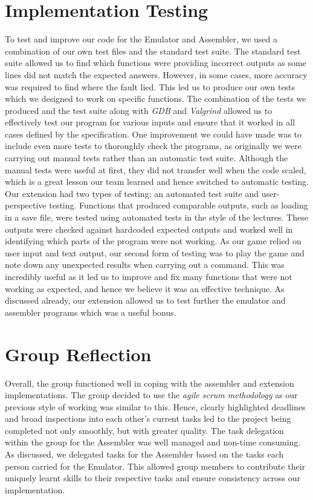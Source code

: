 \documentclass[10pt]{article}
\begin{document}
\section*{Implementation Testing}

To test and improve our code for the Emulator and Assembler, we used a combination of our own test files and the standard test suite. The standard test suite allowed us to find which functions were providing incorrect outputs as some lines did not match the expected answers. However, in some cases, more accuracy was required to find where the fault lied. This led us to produce our own tests which we designed to work on specific functions. The combination of the tests we produced and the test suite along with {\sl GDB} and {\sl Valgrind} allowed us to effectively test our program for various inputs and ensure that it worked in all cases defined by the specification. One improvement we could have made was to include even more tests to thoroughly check the programs, as originally we were carrying out manual tests rather than an automatic test suite. Although the manual tests were useful at first, they did not transfer well when the code scaled, which is a great lesson our team learned and hence switched to automatic testing. 
\\

Our extension had two types of testing: an automated test suite and user-perspective testing. Functions that produced comparable outputs, such as loading in a save file, were tested using automated tests in the style of the lectures. These outputs were checked against hardcoded expected outputs and worked well in identifying which parts of the program were not working. As our game relied on user input and text output, our second form of testing was to play the game and note down any unexpected results when carrying out a command. This was incredibly useful as it led us to improve and fix many functions that were not working as expected, and hence we believe it was an effective technique. As discussed already, our extension allowed us to test further the emulator and assembler programs which was a useful bonus.   

\section*{Group Reflection}

Overall, the group functioned well in coping with the assembler and extension implementations. The group decided to use the {\sl agile scrum methodology} as our previous style of working was similar to this. Hence, clearly highlighted deadlines and broad inspections into each other’s current tasks led to the project being completed not only smoothly, but with greater quality. The task delegation within the group for the Assembler was well managed and non-time consuming. As discussed, we delegated tasks for the Assembler based on the tasks each person carried for the Emulator. This allowed group members to contribute their uniquely learnt skills to their respective tasks and ensure consistency across our implementation. 
\\
\end{document}
